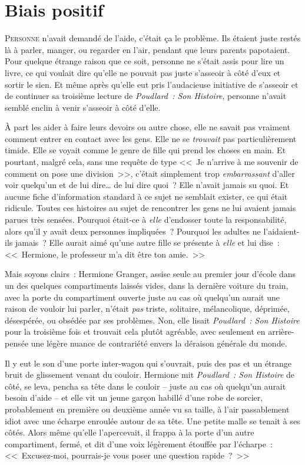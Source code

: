 \chapter{Biais positif}

\lettrine{P}{ersonne} n'avait demandé de l'aide, c'était ça le problème. Ils étaient juste restés là à parler, manger, ou regarder en l'air, pendant que leurs parents papotaient. Pour quelque étrange raison que ce soit, personne ne s'était assis pour lire un livre, ce qui voulait dire qu'elle ne pouvait pas juste s'asseoir à côté d'eux et sortir le sien. Et même après qu'elle eut pris l'audacieuse initiative de s'asseoir et de continuer sa troisième lecture de \emph{Poudlard~: Son Histoire}, personne n'avait semblé enclin à venir s'asseoir à côté d'elle.

À part les aider à faire leurs devoirs ou autre chose, elle ne savait pas vraiment comment entrer en contact avec les gens. Elle ne se \emph{trouvait} pas particulièrement timide. Elle se voyait comme le genre de fille qui prend les choses en main. Et pourtant, malgré cela, sans une requête de type <<~Je n'arrive à me souvenir de comment on pose une division~>>, c'était simplement trop \emph{embarrassant} d'aller voir quelqu'un et de lui dire… de lui dire quoi~? Elle n'avait jamais su quoi. Et aucune fiche d'information standard à ce sujet ne semblait exister, ce qui était ridicule. Toutes ces histoires au sujet de rencontrer les gens ne lui avaient jamais parues très sensées. Pourquoi était-ce à \emph{elle} d'endosser toute la responsabilité, alors qu'il y avait deux personnes impliquées~? Pourquoi les adultes ne l'aidaient-ils jamais~? Elle aurait aimé qu'une autre fille se présente à \emph{elle} et lui dise~: <<~Hermione, le professeur m'a dit être ton amie.~>>

Mais soyons clairs~: Hermione Granger, assise seule au premier jour d'école dans un des quelques compartiments laissés vides, dans la dernière voiture du train, avec la porte du compartiment ouverte juste au cas où quelqu'un aurait une raison de vouloir lui parler, n'était \emph{pas} triste, solitaire, mélancolique, déprimée, désespérée, ou obsédée par ses problèmes. Non, elle lisait \emph{Poudlard~: Son Histoire} pour la troisième fois et trouvait cela plutôt agréable, avec seulement en arrière-pensée une légère nuance de contrariété envers la déraison générale du monde.

Il y eut le son d'une porte inter-wagon qui s'ouvrait, puis des pas et un étrange bruit de glissement venant du couloir. Hermione mit \emph{Poudlard~: Son Histoire} de côté, se leva, pencha sa tête dans le couloir -- juste au cas où quelqu'un aurait besoin d'aide -- et elle vit un jeune garçon habillé d’une robe de sorcier, probablement en première ou deuxième année vu sa taille, à l'air passablement idiot avec une écharpe enroulée autour de sa tête. Une petite malle se tenait à ses côtés. Alors même qu'elle l'apercevait, il frappa à la porte d'un autre compartiment, fermé, et dit d'une voix légèrement étouffée par l'écharpe~: <<~Excusez-moi, pourrais-je vous poser une question rapide~?~>>

